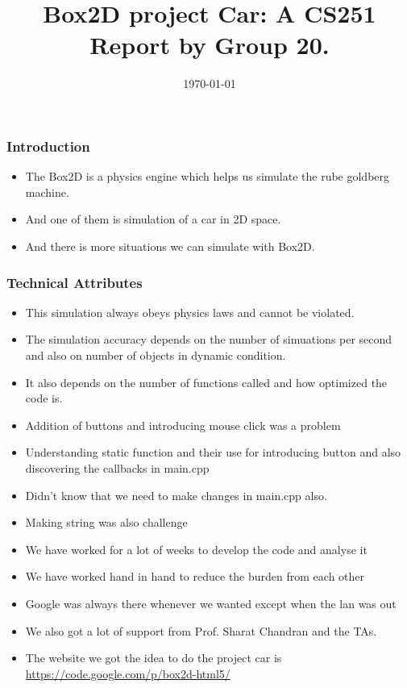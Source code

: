 \documentclass{beamer}
\author[Abhinav \& Surya \& Rishabh]
{%
   \texorpdfstring{
        \begin{columns}
            \column{.4\linewidth}
            \centering
            Abhinav\\
            {140050054}\\
            {abhinavrondi11296@gmail.com}
            \column{.4\linewidth}
            \centering
            Surya\\
            {140050055}\\
            {suri892010@gmail.com}
            \column{.33\linewidth}
            \centering
            Rishabh\\
            {140050061}\\
            {rishabh6417@gmail.com}
        \end{columns}
   }
   {John Doe \& Jane Doe}
}
\title{Box2D project Car: A CS251 Report by Group 20.}
\date{\today}
\begin{document}
\begin{frame}
\titlepage
\end{frame}
\begin{frame}
\frametitle{Introduction}
\begin{itemize}
\item The Box2D is a physics engine which helps us simulate the rube goldberg machine.
\item And one of them is simulation of a car in 2D space.
\item And there is more situations we can simulate with Box2D.
\end{itemize}
\end{frame}
\begin{frame}
\frametitle{Technical Attributes}
\begin{itemize}
\item This simulation always obeys physics laws and cannot be violated.
\item The simulation accuracy depends on the number of simuations per second and also on number of objects in dynamic condition.
\item It also depends on the number of functions called and how optimized the code is.
\end{itemize}
\end{frame}
\begin{frame}
\begin{itemize}
\frametitle{Challenges faced }
\item Addition of buttons and introducing mouse click was a problem
\item Understanding static function and their use for introducing button and also discovering the callbacks in main.cpp
\item Didn't know that we need to make changes in main.cpp also.
\item Making string was also challenge
\end{itemize}
\end{frame}
\begin{frame}
\begin{itemize}
\frametitle{Efforts }
\item We have worked for a lot of weeks to develop the code and analyse it
\item We have worked hand in hand to reduce the burden from each other
\end{itemize}
\end{frame}
\begin{frame}
\begin{itemize}
\frametitle{Acknowledgements }
\item Google was always there whenever we wanted except when the lan was out
\item We also got a lot of support from Prof. Sharat Chandran and the TAs.
\item The website we got the idea to do the project car is \url{https://code.google.com/p/box2d-html5/}
\end{itemize}
\end{frame}
\end{document}
